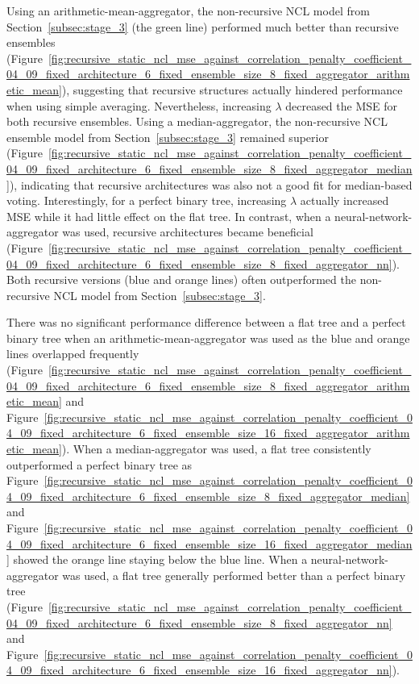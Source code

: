 Using an arithmetic-mean-aggregator, the non-recursive NCL model from Section~\ref{subsec:stage_3} (the green line) performed much better than recursive ensembles (Figure~\ref{fig:recursive_static_ncl_mse_against_correlation_penalty_coefficient_04_09_fixed_architecture_6_fixed_ensemble_size_8_fixed_aggregator_arithmetic_mean}), suggesting that recursive structures actually hindered performance when using simple averaging. Nevertheless, increasing $\lambda$ decreased the MSE for both recursive ensembles. Using a median-aggregator, the non-recursive NCL ensemble model from Section~\ref{subsec:stage_3} remained superior (Figure~\ref{fig:recursive_static_ncl_mse_against_correlation_penalty_coefficient_04_09_fixed_architecture_6_fixed_ensemble_size_8_fixed_aggregator_median}), indicating that recursive architectures was also not a good fit for median-based voting. Interestingly, for a perfect binary tree, increasing $\lambda$ actually increased MSE while it had little effect on the flat tree. In contrast, when a neural-network-aggregator was used, recursive architectures became beneficial (Figure~\ref{fig:recursive_static_ncl_mse_against_correlation_penalty_coefficient_04_09_fixed_architecture_6_fixed_ensemble_size_8_fixed_aggregator_nn}). Both recursive versions (blue and orange lines) often outperformed the non-recursive NCL model from Section~\ref{subsec:stage_3}. 

There was no significant performance difference between a flat tree and a perfect binary tree when an arithmetic-mean-aggregator was used as the blue and orange lines overlapped frequently (Figure~\ref{fig:recursive_static_ncl_mse_against_correlation_penalty_coefficient_04_09_fixed_architecture_6_fixed_ensemble_size_8_fixed_aggregator_arithmetic_mean} and Figure~\ref{fig:recursive_static_ncl_mse_against_correlation_penalty_coefficient_04_09_fixed_architecture_6_fixed_ensemble_size_16_fixed_aggregator_arithmetic_mean}). When a median-aggregator was used, a flat tree consistently outperformed a perfect binary tree as Figure~\ref{fig:recursive_static_ncl_mse_against_correlation_penalty_coefficient_04_09_fixed_architecture_6_fixed_ensemble_size_8_fixed_aggregator_median} and Figure~\ref{fig:recursive_static_ncl_mse_against_correlation_penalty_coefficient_04_09_fixed_architecture_6_fixed_ensemble_size_16_fixed_aggregator_median} showed the orange line staying below the blue line. When a neural-network-aggregator was used, a flat tree generally performed better than a perfect binary tree (Figure~\ref{fig:recursive_static_ncl_mse_against_correlation_penalty_coefficient_04_09_fixed_architecture_6_fixed_ensemble_size_8_fixed_aggregator_nn} and Figure~\ref{fig:recursive_static_ncl_mse_against_correlation_penalty_coefficient_04_09_fixed_architecture_6_fixed_ensemble_size_16_fixed_aggregator_nn}). 

